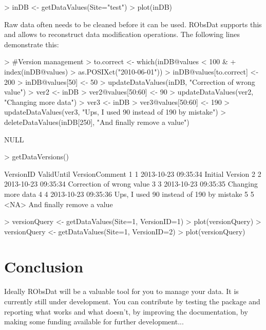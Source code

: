 \documentclass[a4paper]{article}
\begin{document}
\begin{Schunk}
\begin{Sinput}
> inDB <- getDataValues(Site="test")
> plot(inDB)
\end{Sinput}
\end{Schunk}

Raw data often needs to be cleaned before it can
be used. RObsDat supports this and allows to
reconstruct data modification operations. The
following lines demonstrate this:

\begin{Schunk}
\begin{Sinput}
> #Version management
> to.correct <- which(inDB@values < 100 & 
+ 	index(inDB@values) > as.POSIXct("2010-06-01"))
> inDB@values[to.correct] <- 200
> inDB@values[50] <- 50
> updateDataValues(inDB, "Correction of wrong value")
> ver2 <- inDB
> ver2@values[50:60] <- 90
> updateDataValues(ver2, "Changing more data")
> ver3 <- inDB
> ver3@values[50:60] <- 190
> updateDataValues(ver3, "Ups, I used 90 instead of 190 by mistake")
> deleteDataValues(inDB[250],  "And finally remove a value")
\end{Sinput}
\begin{Soutput}
NULL
\end{Soutput}
\begin{Sinput}
> getDataVersions()
\end{Sinput}
\begin{Soutput}
  VersionID          ValidUntil                           VersionComment
1         1 2013-10-23 09:35:34                          Initial Version
2         2 2013-10-23 09:35:34                Correction of wrong value
3         3 2013-10-23 09:35:35                       Changing more data
4         4 2013-10-23 09:35:36 Ups, I used 90 instead of 190 by mistake
5         5                <NA>               And finally remove a value
\end{Soutput}
\begin{Sinput}
> versionQuery <- getDataValues(Site=1, VersionID=1)
> plot(versionQuery)
> versionQuery <- getDataValues(Site=1, VersionID=2)
> plot(versionQuery)
\end{Sinput}
\end{Schunk}

\section{Conclusion}
\label{sec:conclusion}
Ideally RObsDat will be a valuable tool for you to
manage your data. It is currently still under
development. You can contribute by testing the
package and reporting what works and what doesn't,
by improving the documentation, by making some
funding available for further development...
\end{document}
